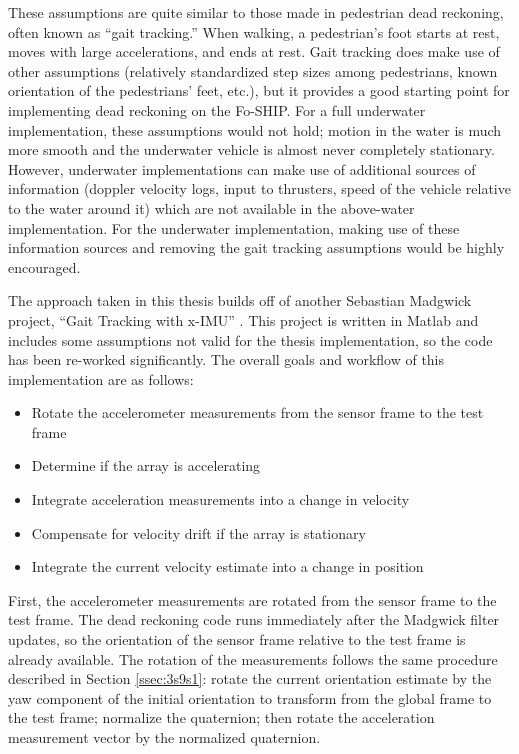 \documentclass[11pt]{ucthesisCP}
\begin{document}
These assumptions are quite similar to those made in pedestrian dead reckoning, often known as “gait tracking.” When walking, a pedestrian’s foot starts at rest, moves with large accelerations, and ends at rest. Gait tracking does make use of other assumptions (relatively standardized step sizes among pedestrians, known orientation of the pedestrians’ feet, etc.), but it provides a good starting point for implementing dead reckoning on the Fo-SHIP. For a full underwater implementation, these assumptions would not hold; motion in the water is much more smooth and the underwater vehicle is almost never completely stationary. However, underwater implementations can make use of additional sources of information (doppler velocity logs, input to thrusters, speed of the vehicle relative to the water around it) which are not available in the above-water implementation. For the underwater implementation, making use of these information sources and removing the gait tracking assumptions would be highly encouraged.

The approach taken in this thesis builds off of another Sebastian Madgwick project, “Gait Tracking with x-IMU” \cite{madgstep}. This project is written in Matlab and includes some assumptions not valid for the thesis implementation, so the code has been re-worked significantly. The overall goals and workflow of this implementation are as follows:
\begin{itemize}[noitemsep,topsep=0pt,]
\item Rotate the accelerometer measurements from the sensor frame to the test frame
\item Determine if the array is accelerating
\item Integrate acceleration measurements into a change in velocity
\item Compensate for velocity drift if the array is stationary
\item Integrate the current velocity estimate into a change in position
\end{itemize}

First, the accelerometer measurements are rotated from the sensor frame to the test frame. The dead reckoning code runs immediately after the Madgwick filter updates, so the orientation of the sensor frame relative to the test frame is already available. The rotation of the measurements follows the same procedure described in Section \ref{ssec:3s9s1}: rotate the current orientation estimate by the yaw component of the initial orientation to transform from the global frame to the test frame; normalize the quaternion; then rotate the acceleration measurement vector by the normalized quaternion.
\end{document}
